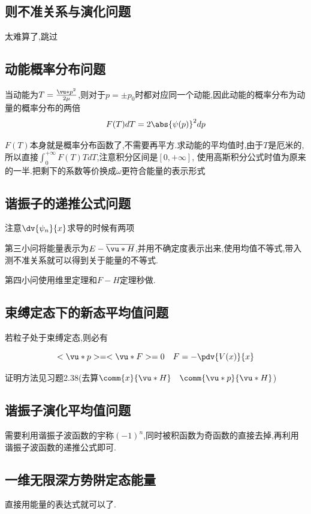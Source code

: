        \subsection{则不准关系与演化问题}
            太难算了,跳过
        \subsection{动能概率分布问题}
            当动能为$T = \frac{\vu*{p}^{2}}{2 \mu}$,则对于$p=\pm p_{0}$时都对应同一个动能,因此动能的概率分布为动量的概率分布的两倍
            $$ F(T)dT = 2 \abs{\psi(p)}^{2} dp $$

            $F(T)$本身就是概率分布函数了,不需要再平方.求动能的平均值时,由于$T$是厄米的,所以直接$\int_{0}^{+\infty} F(T) T dT $,注意积分区间是$[0,+\infty]$,
            使用高斯积分公式时值为原来的一半.把剩下的系数等价换成$\omega$更符合能量的表示形式

        \subsection{谐振子的递推公式问题}
            注意$\dv{\psi_{n}}{x}$求导的时候有两项

            第三小问将能量表示为$E - \overline{\vu*{H}} $,并用不确定度表示出来,使用均值不等式,带入测不准关系就可以得到关于能量的不等式.

            第四小问使用维里定理和$F-H$定理秒做.

        \subsection{束缚定态下的新态平均值问题}
            \begin{formal}
                
                若粒子处于束缚定态,则必有
                
                $$ <\vu*{p}> = <\vu*{F}> = 0 \quad F = -\pdv{V(x)}{x} $$

                证明方法见习题2.38(去算$\comm{x}{\vu*{H}} \quad \comm{\vu*{p}}{\vu*{H}}$)
            \end{formal}

        \subsection{谐振子演化平均值问题}
            需要利用谐振子波函数的宇称$(-1)^{n}$,同时被积函数为奇函数的直接去掉,再利用谐振子波函数的递推公式即可.


        \subsection{一维无限深方势阱定态能量}
            直接用能量的表达式就可以了.
